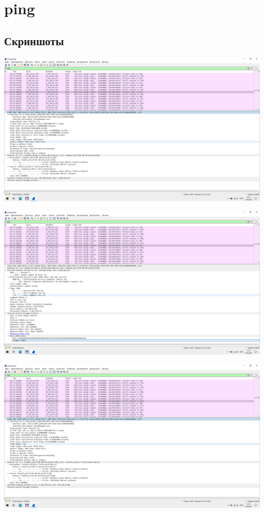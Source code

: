 
\section{ping}

\subsection{Скриншоты}

\begin{center}

    \includegraphics[width=\textwidth]{screenshots/ping_1000_request_1}

    \includegraphics[width=\textwidth]{screenshots/ping_1000_request_2}

    \includegraphics[width=\textwidth]{screenshots/ping_1000_response_1}


\end{center}
